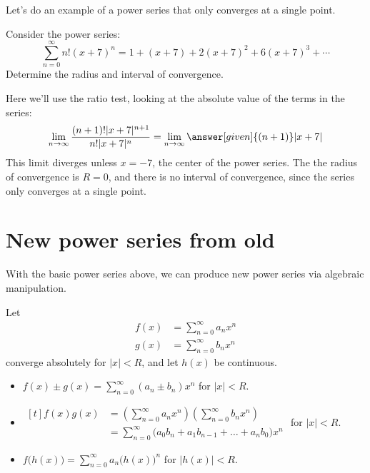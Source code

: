 \documentclass{ximera}
\begin{document}
Let's do an example of a power series that only converges at a single
point.

\begin{example}
  Consider the power series:
  \[
  \sum_{n=0}^\infty n!(x+7)^n = 1 + (x+7) + 2(x+7)^2 + 6(x+7)^3 + \cdots
  \]
  Determine the radius and interval of convergence.
  \begin{explanation}
    Here we'll use the ratio test, looking at the absolute value of
    the terms in the series:
    \[
    \lim_{n\to\infty} \frac{(n+1)!|x+7|^{n+1}}{n!|x+7|^n}= \lim_{n\to\infty} \answer[given]{(n+1)}|x+7|
    \]
    This limit diverges unless $x=-7$, the center of the power
    series. The the radius of convergence is $R=0$, and there is no
    interval of convergence, since the series only converges at a
    single point.
  \end{explanation}
\end{example}



\section{New power series from old}

With the basic power series above, we can produce new power series via
algebraic manipulation.

\begin{theorem}
  Let
  \begin{align*}
    f(x) &= \sum_{n=0}^\infty a_nx^n\\
    g(x) &= \sum_{n=0}^\infty b_nx^n
  \end{align*}
  converge absolutely for $|x|<R$, and let $h(x)$ be continuous.
  \begin{itemize}
	\item $f(x)\pm g(x) = \sum_{n=0}^\infty (a_n\pm b_n)x^n$ \quad for $|x|<R$.
	\item $\begin{aligned}[t]
	f(x)g(x) &= \left(\sum_{n=0}^\infty a_nx^n\right)\left(\sum_{n=0}^\infty b_nx^n\right)\\
	      &= \sum_{n=0}^\infty\big(a_0b_n+a_1b_{n-1}+\dots + a_nb_0\big)x^n
		\end{aligned}$ for $|x|<R$.%
	
	\item $f\big(h(x)\big) = \sum_{n=0}^\infty a_n\big(h(x)\big)^n$ \quad for $|h(x)|<R$.

  \end{itemize}
\end{theorem}
\end{document}
